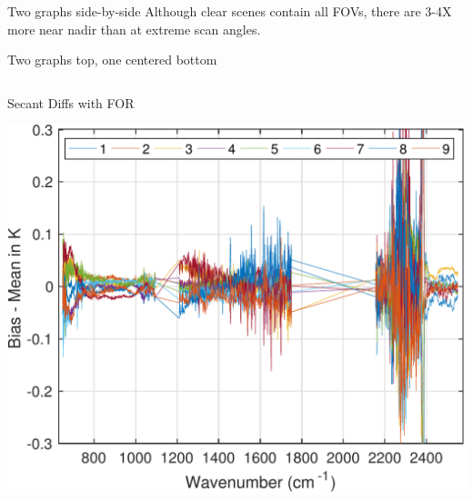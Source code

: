 \documentclass[10pt,t]{beamer}
\begin{document}
\begin{frame}[label={sec:orgb987c5f}]{Two graphs side-by-side}
  Although clear scenes contain all FOVs, there are 3-4X more near nadir than at extreme scan angles.
\end{frame}
\begin{frame}[label={sec:org4279c0f}]{Two graphs top, one centered bottom}
  \vspace{-0.35in}

  \begin{columns}
    \begin{column}{0.5\columnwidth}
      \begin{block}{\footnotesize Secant Diffs with FOR}
        \vspace{-0.05in}
        \vspace{-0.05in}
        \begin{center}
          \includegraphics[width=0.85\linewidth]{./testfig.pdf}
        \end{center}
      \end{block}
    \end{column}


\end{columns}
\end{frame}
\end{document}

